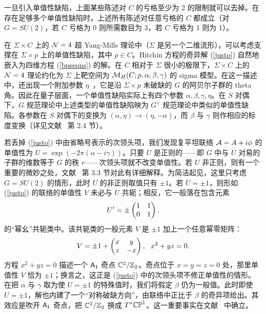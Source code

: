 
一旦引入单值性缺陷，上面某些陈述对 $C$ 的亏格至少为 2 的限制就可以去掉。在存在足够多个单值性缺陷时，上述所有陈述对任意亏格的 $C$ 都成立（对 $G=SU(2)$，若 $C$ 亏格为 0 则所需数目为 3，若 $C$ 亏格为 1 则为 1）。

在 $\Sigma\times C$ 上的 ${\mathcal N}=4$ 超 Yang-Mills 理论中（$\Sigma$ 是另一个二维流形），可以考虑支撑在 $\Sigma\times p$ 上的单值性缺陷，其中 $p\in C$。Hitchin 方程的奇异解 (\ref{justo}) 自然地嵌入为四维方程 (\ref{bpseqns}) 的解。在 $C$ 相对于 $\Sigma$ 很小的极限下，$\Sigma\times C$ 上的 ${\mathcal N}=4$ 理论约化为 $\Sigma$ 上靶空间为 ${\mathcal M}_H(C;p,\alpha,\beta, \gamma)$ 的 sigma 模型。在这一描述中，还出现一个附加参数 $\eta$~\cite{GuW}，它是沿 $\Sigma\times p$ 未破缺的 $G$ 的阿贝尔子群的 theta 角。因此在量子层面，一个单值性缺陷实际上有四个参数 $\alpha,\beta,\gamma, \eta$。在 $S$ 对偶下，$G$ 规范理论中上述类型的单值性缺陷映为 $G^\vee$ 规范理论中类似的单值性缺陷。各参数在 $S$ 对偶下的变换为 $(\alpha,\eta)\to (\eta,-\alpha)$，而 $\beta$ 与 $\gamma$ 则作相应的标度变换（详见文献~\cite{GuW} 第 2.4 节）。

若丢掉 (\ref{justo}) 中由省略号表示的次领头项，我们发现复平坦联络 ${\mathcal A}=A+i\phi$ 的单值性为 $U=\exp(-2\pi(\alpha-i\gamma))$。只要 $U$ 是正则的——即 $G$ 中与 $U$ 对易的子群的维数等于 $G$ 的秩 $r$——次领头项就不改变单值性。若 $U$ 非正则，则有一个重要的微妙之处，文献~\cite{GuW} 第 3.3 节对此有详细解释。为简洁起见，这里只考虑 $G=SU(2)$ 的情形，此时 $U$ 的非正则取值只有 $\pm 1$。若 $U=\pm 1$，则形如 (\ref{justo}) 的联络的单值性 $V$ 未必与 $U$ 共轭；相反，它一般落在包含元素
\begin{equation}\label{zonk}U'=\pm \begin{pmatrix}1 & 1 \cr 0 & 1 \end{pmatrix}.\end{equation}
的“幂幺”共轭类中。该共轭类的一般元素 $V$ 是 $\pm 1$ 加上一个任意幂零矩阵：
\begin{equation}\label{onk}V=\pm 1 + \begin{pmatrix} x & y \cr z & -x \end{pmatrix},~~x^2+yz=0.
\end{equation}
方程 $x^2+yz=0$ 描述一个 $\sf A_1$ 奇点 ${\mathbb C}^2/{\mathbb Z}_2$。奇点位于 $x=y=z=0$ 处，那里单值性 $V$ 恰为 $\pm 1$；换言之，这正是 (\ref{justo}) 中的次领头项不修正单值性的情形。在把 $\alpha$ 与 $\gamma$ 取为使 $U=\pm 1$ 的特殊值时，我们将假定 $\beta$ 仍为一般值。此时即使 $U=\pm 1$，解也内建了一个“对称破缺方向”，由联络中正比于 $\beta$ 的奇异项给出。其效应是吹开 $\sf A_1$ 奇点，把 ${\mathbb C}^2/{\mathbb Z}_2$ 换成 $T^*{\mathbb{CP}}^1$。这一重要事实在文献~\cite{Simpson} 中确立。

